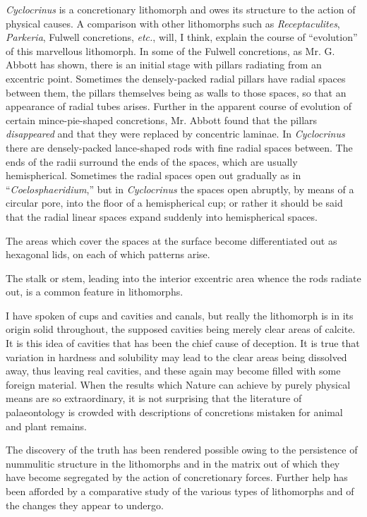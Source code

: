 \documentclass[a4paper, 12pt, oneside, landscape]{article}
\begin{document}
\emph{Cyclocrinus} is a concretionary lithomorph and owes its structure to the action of physical causes. A comparison with other lithomorphs such as \emph{Receptaculites}, \emph{Parkeria}, Fulwell concretions, \emph{etc.}, will, I think, explain the course of ``evolution'' of this marvellous lithomorph. In some of the Fulwell concretions, as Mr. G. Abbott has shown, there is an initial stage with pillars radiating from an excentric point. Sometimes the densely-packed radial pillars have radial spaces between them, the pillars themselves being as walls to those spaces, so that an appearance of radial tubes arises. Further in the apparent course of evolution of certain mince-pie-shaped concretions, Mr. Abbott found that the pillars \emph{disappeared} and that they were replaced by concentric laminae. In \emph{Cyclocrinus} there are densely-packed lance-shaped rods with fine radial spaces between. The ends of the radii surround the ends of the spaces, which are usually hemispherical. Sometimes the radial spaces open out gradually as in ``\emph{Coelosphaeridium},'' but in \emph{Cyclocrinus} the spaces open abruptly, by means of a circular pore, into the floor of a hemispherical cup; or rather it should be said that the radial linear spaces expand suddenly into hemispherical spaces.

The areas which cover the spaces at the surface become differentiated out as hexagonal lids, on each of which patterns arise.

The stalk or stem, leading into the interior excentric area whence the rods radiate out, is a common feature in lithomorphs.

I have spoken of cups and cavities and canals, but really the lithomorph is in its origin solid throughout, the supposed cavities being merely clear areas of calcite. It is this idea of cavities that has been the chief cause of deception. It is true that variation in hardness and solubility may lead to the clear areas being dissolved away, thus leaving real cavities, and these again may become filled with some foreign material. When the results which Nature can achieve by purely physical means are so extraordinary, it is not surprising that the literature of palaeontology is crowded with descriptions of concretions mistaken for animal and plant remains.

The discovery of the truth has been rendered possible owing to the persistence of nummulitic structure in the lithomorphs and in the matrix out of which they have become segregated by the action of concretionary forces. Further help has been afforded by a comparative study of the various types of lithomorphs and of the changes they appear to undergo.
\end{document}
